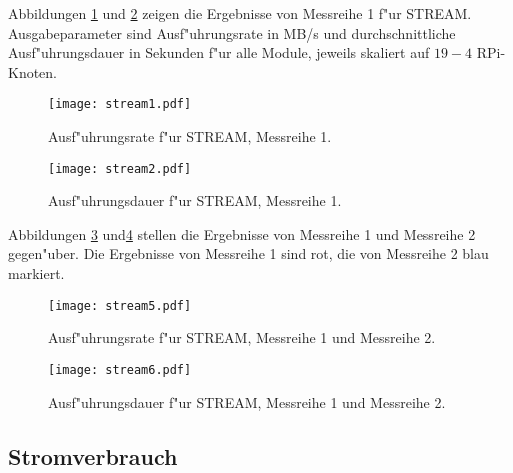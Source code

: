 {Abbildungen \ref{fig:stream1} und \ref{fig:stream2} zeigen die Ergebnisse von Messreihe 1 f"ur STREAM. Ausgabeparameter sind Ausf"uhrungsrate in MB/s und durchschnittliche Ausf"uhrungsdauer in Sekunden f"ur alle Module, jeweils skaliert auf $19-4$ RPi-Knoten. 
\begin{figure}[htb]
  \centering
  \texttt{[image: stream1.pdf]}\\ 
  \caption{Ausf"uhrungsrate f"ur STREAM, Messreihe 1.}
  \label{fig:stream1}		
\end{figure}
\begin{figure}[H]
  \centering
  \texttt{[image: stream2.pdf]}\\ 
  \caption{Ausf"uhrungsdauer f"ur STREAM, Messreihe 1.}
  \label{fig:stream2}		
\end{figure}
\newpage
\noindent
Abbildungen \ref{fig:stream5} und\ref{fig:stream6} stellen die Ergebnisse von Messreihe 1 und Messreihe 2 gegen"uber. Die Ergebnisse von Messreihe 1 sind rot, die von Messreihe 2 blau markiert. 
\begin{figure}[htb]
  \centering
  \texttt{[image: stream5.pdf]}\\ 
  \caption{Ausf"uhrungsrate f"ur STREAM, Messreihe 1 und Messreihe 2.}\label{fig:stream5}
\end{figure}
\begin{figure}[H]
  \centering
  \texttt{[image: stream6.pdf]}\\ 
  \caption{Ausf"uhrungsdauer f"ur STREAM, Messreihe 1 und Messreihe 2.}\label{fig:stream6}
\end{figure}
\newpage
\subsection{Stromverbrauch}\label{Ergebnisse-Energenie}

}
